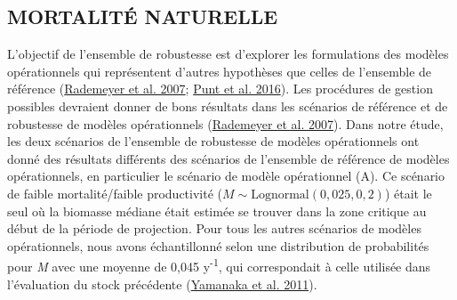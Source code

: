 \documentclass[french,11pt]{book}
\begin{document}
\hypertarget{sec:discussion-m}{%
\subsection{MORTALITÉ NATURELLE}\label{sec:discussion-m}}

L'objectif de l'ensemble de robustesse est d'explorer les formulations des modèles opérationnels qui représentent d'autres hypothèses que celles de l'ensemble de référence (\protect\hyperlink{ref-rademeyer2007}{Rademeyer et al. 2007}; \protect\hyperlink{ref-punt2016}{Punt et al. 2016}). Les procédures de gestion possibles devraient donner de bons résultats dans les scénarios de référence et de robustesse de modèles opérationnels (\protect\hyperlink{ref-rademeyer2007}{Rademeyer et al. 2007}). Dans notre étude, les deux scénarios de l'ensemble de robustesse de modèles opérationnels ont donné des résultats différents des scénarios de l'ensemble de référence de modèles opérationnels, en particulier le scénario de modèle opérationnel (A). Ce scénario de faible mortalité/faible productivité (\(M \sim \textrm{Lognormal}(0,025, 0,2)\)) était le seul où la biomasse médiane était estimée se trouver dans la zone critique au début de la période de projection. Pour tous les autres scénarios de modèles opérationnels, nous avons échantillonné selon une distribution de probabilités pour \emph{M} avec une moyenne de 0,045 y\textsuperscript{-1}, qui correspondait à celle utilisée dans l'évaluation du stock précédente (\protect\hyperlink{ref-yamanaka2011}{Yamanaka et al. 2011}).
\end{document}
